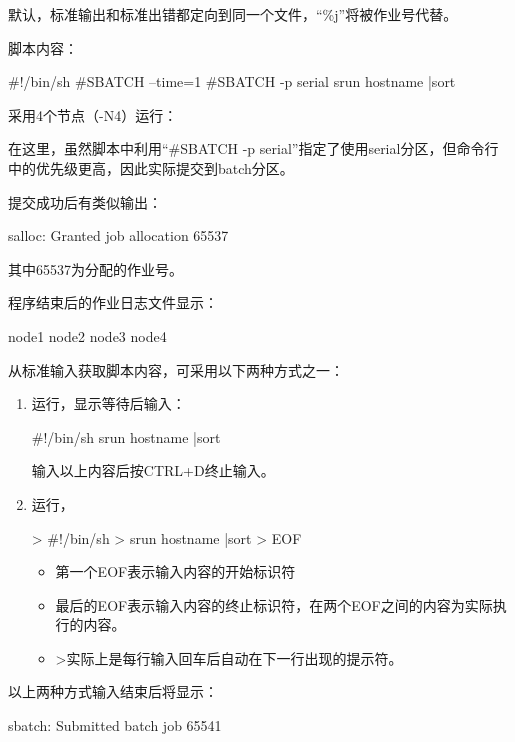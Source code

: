 默认，标准输出和标准出错都定向到同一个文件，``\%j''将被作业号代替。

脚本内容：
\begin{SH}
#!/bin/sh
#SBATCH --time=1
#SBATCH -p serial
srun hostname |sort
\end{SH}

采用4个节点（-N4）运行：

在这里，虽然脚本中利用``\#SBATCH -p serial''指定了使用serial分区，但命令行中的优先级更高，因此实际提交到batch分区。

提交成功后有类似输出：
\begin{OUT}
salloc: Granted job allocation 65537
\end{OUT}
其中65537为分配的作业号。

程序结束后的作业日志文件显示：
\begin{OUT}
node1
node2
node3
node4
\end{OUT}

从标准输入获取脚本内容，可采用以下两种方式之一：
\begin{enumerate}
	\item 运行，显示等待后输入：
\begin{SH}
#!/bin/sh
srun hostname |sort
\end{SH}
输入以上内容后按CTRL+D终止输入。
	\item 运行，
	\begin{SH}
> #!/bin/sh
> srun hostname |sort
> EOF
\end{SH}
\begin{itemize}
	\item 第一个EOF表示输入内容的开始标识符
	\item 最后的EOF表示输入内容的终止标识符，在两个EOF之间的内容为实际执行的内容。
	\item >实际上是每行输入回车后自动在下一行出现的提示符。
\end{itemize}
\end{enumerate}

以上两种方式输入结束后将显示：
\begin{OUT}
sbatch: Submitted batch job 65541
\end{OUT}

